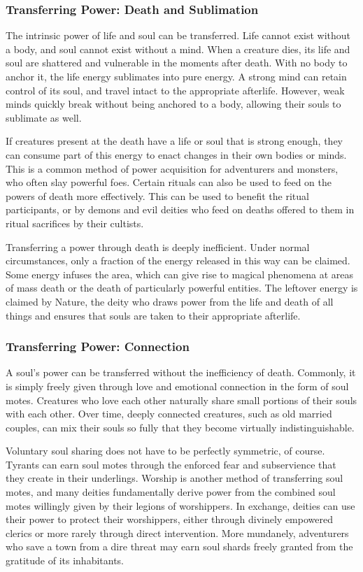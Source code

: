     \subsubsection{Transferring Power: Death and Sublimation}
      The intrinsic power of life and soul can be transferred.
      Life cannot exist without a body, and soul cannot exist without a mind.
      When a creature dies, its life and soul are shattered and vulnerable in the moments after death.
      With no body to anchor it, the life energy sublimates into pure energy.
      A strong mind can retain control of its soul, and travel intact to the appropriate afterlife.
      However, weak minds quickly break without being anchored to a body, allowing their souls to sublimate as well.

      If creatures present at the death have a life or soul that is strong enough, they can consume part of this energy to enact changes in their own bodies or minds.
      This is a common method of power acquisition for adventurers and monsters, who often slay powerful foes.
      Certain rituals can also be used to feed on the powers of death more effectively.
      This can be used to benefit the ritual participants, or by demons and evil deities who feed on deaths offered to them in ritual sacrifices by their cultists.

      Transferring a power through death is deeply inefficient.
      Under normal circumstances, only a fraction of the energy released in this way can be claimed.
      Some energy infuses the area, which can give rise to magical phenomena at areas of mass death or the death of particularly powerful entities.
      The leftover energy is claimed by Nature, the deity who draws power from the life and death of all things and ensures that souls are taken to their appropriate afterlife.

    \subsubsection{Transferring Power: Connection}
      A soul's power can be transferred without the inefficiency of death.
      Commonly, it is simply freely given through love and emotional connection in the form of soul motes.
      Creatures who love each other naturally share small portions of their souls with each other.
      Over time, deeply connected creatures, such as old married couples, can mix their souls so fully that they become virtually indistinguishable.

      Voluntary soul sharing does not have to be perfectly symmetric, of course.
      Tyrants can earn soul motes through the enforced fear and subservience that they create in their underlings.
      Worship is another method of transferring soul motes, and many deities fundamentally derive power from the combined soul motes willingly given by their legions of worshippers.
      In exchange, deities can use their power to protect their worshippers, either through divinely empowered clerics or more rarely through direct intervention.
      More mundanely, adventurers who save a town from a dire threat may earn soul shards freely granted from the gratitude of its inhabitants.

